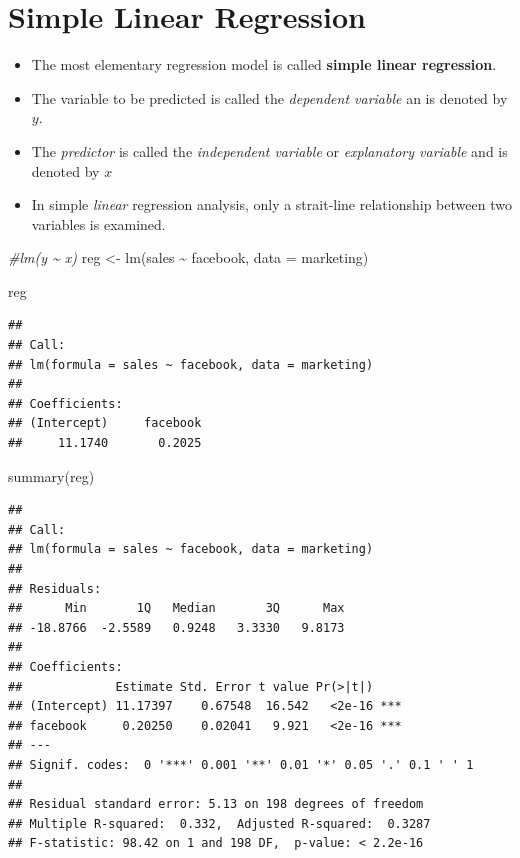 \documentclass[
]{book}
\newenvironment{Shaded}{\begin{snugshade}}{\end{snugshade}}
\newcommand{\AttributeTok}[1]{\textcolor[rgb]{0.77,0.63,0.00}{#1}}
\newcommand{\CommentTok}[1]{\textcolor[rgb]{0.56,0.35,0.01}{\textit{#1}}}
\newcommand{\FunctionTok}[1]{\textcolor[rgb]{0.00,0.00,0.00}{#1}}
\newcommand{\NormalTok}[1]{#1}
\newcommand{\OtherTok}[1]{\textcolor[rgb]{0.56,0.35,0.01}{#1}}
\newcommand{\SpecialCharTok}[1]{\textcolor[rgb]{0.00,0.00,0.00}{#1}}
\begin{document}
\hypertarget{simple-linear-regression}{%
\section{Simple Linear Regression}\label{simple-linear-regression}}

\begin{itemize}
\item
  The most elementary regression model is called \textbf{simple linear regression}.
\item
  The variable to be predicted is called the \emph{dependent variable} an is denoted by \(y\).
\item
  The \emph{predictor} is called the \emph{independent variable} or \emph{explanatory variable} and is denoted by \(x\)
\item
  In simple \emph{linear} regression analysis, only a strait-line relationship between two variables is examined.
\end{itemize}

\begin{Shaded}
\begin{Highlighting}[]
\CommentTok{\#lm(y \textasciitilde{} x)}
\NormalTok{reg }\OtherTok{\textless{}{-}} \FunctionTok{lm}\NormalTok{(sales }\SpecialCharTok{\textasciitilde{}}\NormalTok{ facebook,  }\AttributeTok{data =}\NormalTok{ marketing)}

\NormalTok{reg}
\end{Highlighting}
\end{Shaded}

\begin{verbatim}
## 
## Call:
## lm(formula = sales ~ facebook, data = marketing)
## 
## Coefficients:
## (Intercept)     facebook  
##     11.1740       0.2025
\end{verbatim}

\begin{Shaded}
\begin{Highlighting}[]
\FunctionTok{summary}\NormalTok{(reg)}
\end{Highlighting}
\end{Shaded}

\begin{verbatim}
## 
## Call:
## lm(formula = sales ~ facebook, data = marketing)
## 
## Residuals:
##      Min       1Q   Median       3Q      Max 
## -18.8766  -2.5589   0.9248   3.3330   9.8173 
## 
## Coefficients:
##             Estimate Std. Error t value Pr(>|t|)    
## (Intercept) 11.17397    0.67548  16.542   <2e-16 ***
## facebook     0.20250    0.02041   9.921   <2e-16 ***
## ---
## Signif. codes:  0 '***' 0.001 '**' 0.01 '*' 0.05 '.' 0.1 ' ' 1
## 
## Residual standard error: 5.13 on 198 degrees of freedom
## Multiple R-squared:  0.332,  Adjusted R-squared:  0.3287 
## F-statistic: 98.42 on 1 and 198 DF,  p-value: < 2.2e-16
\end{verbatim}
\end{document}

